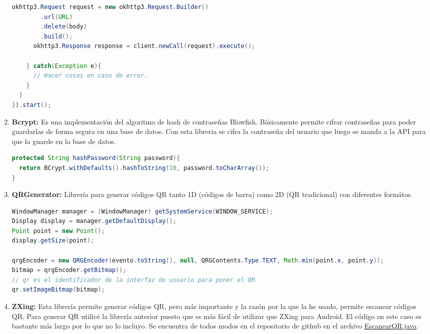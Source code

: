 \begin{enumerate}
\begin{lstlisting}[language=Java,float=ht,caption={[Java] Ejemplo de llamada DELETE con OkHttp.},label=lst:okhttp]
      okhttp3.Request request = new okhttp3.Request.Builder()
        .url(URL)
        .delete(body)
        .build();
      okhttp3.Response response = client.newCall(request).execute();

    } catch(Exception e){
      // Hacer cosas en caso de error.
    }
  }
}).start();
\end{lstlisting}

\item \textbf{Bcrypt: } Es una implementación del algoritmo de hash de contraseñas Blowfish. Básicamente permite cifrar contraseñas para poder guardarlas de forma segura en una base de datos. Con esta libreria se cifra la contraseña del usuario que luego se manda a la API para que la guarde en la base de datos.
\begin{lstlisting}[language=Java,float=ht,caption={[Java] Ejemplo de cifrado de la contraseña de un usuario.},label=lst:okhttp]
protected String hashPassword(String password){
  return BCrypt.withDefaults().hashToString(10, password.toCharArray());
}

\end{lstlisting}

\item \textbf{QRGenerator: } Librería para generar códigos QR tanto 1D (códigos de barra) como 2D (QR tradicional) con diferentes formátos.
\begin{lstlisting}[language=Java,float=ht,caption={[Java] Ejemplo de Código QR},label=lst:okhttp]
WindowManager manager = (WindowManager) getSystemService(WINDOW_SERVICE);
Display display = manager.getDefaultDisplay();
Point point = new Point();
display.getSize(point);

qrgEncoder = new QRGEncoder(evento.toString(), null, QRGContents.Type.TEXT, Math.min(point.x, point.y));
bitmap = qrgEncoder.getBitmap();
// qr es el identificador de la interfaz de usuario para poner el QR
qr.setImageBitmap(bitmap);
\end{lstlisting}

\item \textbf{ZXing: } Esta librería permite generar códigos QR, pero más importante y la razón por la que la he usado, permite escanear códigos QR. Para generar QR utilicé la librería anterior puesto que es más fácil de utilizar que ZXing para Android. El código en este caso es bastante más largo por lo que no lo incluyo. Se encuentra de todos modos en el repositorio de github en el archivo \href{https://github.com/FORGIS98/TFG/blob/main/Estublock/app/src/main/java/com/example/estublock/EscanearQRTutorial.java}{EscanearQR.java}.

\end{enumerate}


